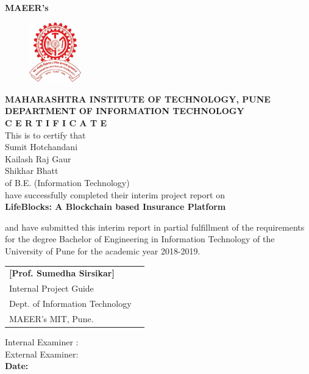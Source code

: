 
\begin{center}
{\bf MAEER's}
\begin{figure}[h]
	\centering
		\includegraphics[width=0.20\textwidth]{Images/MIT_Logo.jpg}
	\label{fig:mit}
\end{figure}

{\bf MAHARASHTRA INSTITUTE OF TECHNOLOGY, PUNE}\\
{\bf DEPARTMENT OF INFORMATION TECHNOLOGY}\\

{\large {\bf C E R T I F I C A T E} \\}
\vspace{0.3in}%
{\large This is to certify that } \\
{ Sumit Hotchandani}\\
{ Kailash Raj Gaur}\\ 
{ Shikhar Bhatt}\\ 
{of B.E. (Information Technology)}\\
{have successfully completed their interim project report on }\\

{\large {\bf LifeBlocks: A Blockchain based Insurance Platform\\}}
\vspace{0.2in}%
\end{center}
{ and have submitted this interim report in partial fulfillment of the requirements for the degree Bachelor of Engineering in Information Technology of 
the University of Pune for the academic year 2018-2019.\\}






\begin{tabular}{ll}
{\bf[Prof. Sumedha Sirsikar]} & \hspace{1.0in}{\bf[Prof. Sumedha Sirsikar]}\\
{Internal Project Guide} & \hspace{1.0in}{Head of Department}\\
{Dept. of Information Technology} & \hspace{1.0in}{Dept. of Information Technology}\\
{MAEER's MIT, Pune.}& \hspace{1.0in}{MAEER's MIT, Pune.}		
\end{tabular}



\vspace{0.3in}\noindent
Internal Examiner :\underline{\hspace{2.0in}}\\
External Examiner:\underline{\hspace{2.0in}}\\
{\bf Date:}

